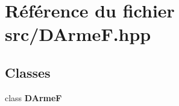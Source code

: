 \section{Référence du fichier src/\-D\-Arme\-F.hpp}
\label{_d_arme_f_8hpp}
\subsection*{Classes}
\begin{DoxyCompactItemize}
\item 
class {\bf D\-Arme\-F}
\end{DoxyCompactItemize}
